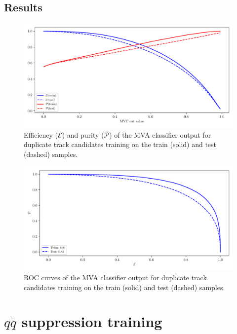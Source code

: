 \subsection*{Results}

\begin{figure}[H]
\centering
\captionsetup{width=0.8\linewidth}
\includegraphics[width=\linewidth]{fig/addendums/curl_effpur}
\caption{Efficiency ($\mathcal{E}$) and purity ($\mathcal{P}$) of the MVA classifier output for duplicate track candidates training on the train (solid) and test (dashed) samples.}
\end{figure}

\begin{figure}[H]
\centering
\captionsetup{width=0.8\linewidth}
\includegraphics[width=\linewidth]{fig/addendums/curl_roc}
\caption{ROC curves of the MVA classifier output for duplicate track candidates training on the train (solid) and test (dashed) samples.}
\end{figure}

\section*{$q \bar q$ suppression training}

